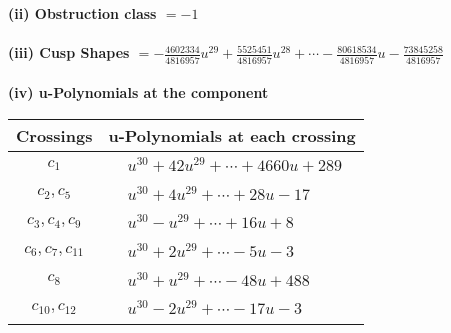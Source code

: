 \documentclass[1p]{elsarticle_modified}
\theoremstyle{definition}
\begin{document}
\flushleft \textbf{(ii) Obstruction class $= -1$}\\~\\
\flushleft \textbf{(iii) Cusp Shapes $= -\frac{4602334}{4816957} u^{29}+\frac{5525451}{4816957} u^{28}+\cdots-\frac{80618534}{4816957} u-\frac{73845258}{4816957}$}\\~\\
\newpage\renewcommand{\arraystretch}{1}
\flushleft \textbf{(iv) u-Polynomials at the component}\newline \\
\begin{tabular}{m{50pt}|m{274pt}}
Crossings & \hspace{64pt}u-Polynomials at each crossing \\
\hline $$\begin{aligned}c_{1}\end{aligned}$$&$\begin{aligned}
&u^{30}+42 u^{29}+\cdots+4660 u+289
\end{aligned}$\\
\hline $$\begin{aligned}c_{2},c_{5}\end{aligned}$$&$\begin{aligned}
&u^{30}+4 u^{29}+\cdots+28 u-17
\end{aligned}$\\
\hline $$\begin{aligned}c_{3},c_{4},c_{9}\end{aligned}$$&$\begin{aligned}
&u^{30}- u^{29}+\cdots+16 u+8
\end{aligned}$\\
\hline $$\begin{aligned}c_{6},c_{7},c_{11}\end{aligned}$$&$\begin{aligned}
&u^{30}+2 u^{29}+\cdots-5 u-3
\end{aligned}$\\
\hline $$\begin{aligned}c_{8}\end{aligned}$$&$\begin{aligned}
&u^{30}+u^{29}+\cdots-48 u+488
\end{aligned}$\\
\hline $$\begin{aligned}c_{10},c_{12}\end{aligned}$$&$\begin{aligned}
&u^{30}-2 u^{29}+\cdots-17 u-3
\end{aligned}$\\
\hline
\end{tabular}\\~\\
\end{document}
